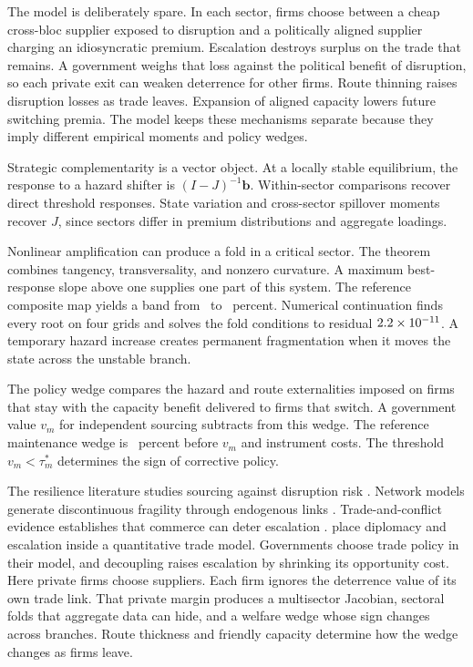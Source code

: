 \documentclass[11pt]{article}
\theoremstyle{definition}
\begin{document}
The model is deliberately spare. In each sector, firms choose between a cheap cross-bloc supplier exposed to disruption and a politically aligned supplier charging an idiosyncratic premium. Escalation destroys surplus on the trade that remains. A government weighs that loss against the political benefit of disruption, so each private exit can weaken deterrence for other firms. Route thinning raises disruption losses as trade leaves. Expansion of aligned capacity lowers future switching premia. The model keeps these mechanisms separate because they imply different empirical moments and policy wedges.

Strategic complementarity is a vector object. At a locally stable equilibrium, the response to a hazard shifter is $(I-J)^{-1}\mathbf b$. Within-sector comparisons recover direct threshold responses. State variation and cross-sector spillover moments recover $J$, since sectors differ in premium distributions and aggregate loadings.

Nonlinear amplification can produce a fold in a critical sector. The theorem combines tangency, transversality, and nonzero curvature. A maximum best-response slope above one supplies one part of this system. The reference composite map yields a band from \FoldLoPct\ to \FoldHiPct\ percent. Numerical continuation finds every root on four grids and solves the fold conditions to residual \(2.2\times10^{-11}\). A temporary hazard increase creates permanent fragmentation when it moves the state across the unstable branch.

The policy wedge compares the hazard and route externalities imposed on firms that stay with the capacity benefit delivered to firms that switch. A government value $v_m$ for independent sourcing subtracts from this wedge. The reference maintenance wedge is \WedgeAtPostPct\ percent before $v_m$ and instrument costs. The threshold $v_m<\tau_m^*$ determines the sign of corrective policy.

The resilience literature studies sourcing against disruption risk \citep{GrossmanHelpmanLhuillier2023}. Network models generate discontinuous fragility through endogenous links \citep{ElliottGolubLeduc2022}. Trade-and-conflict evidence establishes that commerce can deter escalation \citep{MartinMayerThoenig2008,JacksonNei2015}. \citet{MayerMejeanThoenig2025} place diplomacy and escalation inside a quantitative trade model. Governments choose trade policy in their model, and decoupling raises escalation by shrinking its opportunity cost. Here private firms choose suppliers. Each firm ignores the deterrence value of its own trade link. That private margin produces a multisector Jacobian, sectoral folds that aggregate data can hide, and a welfare wedge whose sign changes across branches. Route thickness and friendly capacity determine how the wedge changes as firms leave.
\end{document}
